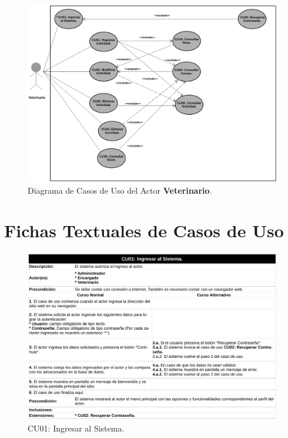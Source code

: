 \documentclass[11pt,oneside]{book}
\begin{document}
\begin{figure}[tbhp]
\centerline{\includegraphics[scale=0.5]{figs/capitulo_2_disenio/Diagrama_CU_Veterinario.pdf}}
\caption{Diagrama de Casos de Uso del Actor \textbf{Veterinario}.}
\label{Ap104}
\end{figure}

\newpage
\clearpage
\section{Fichas Textuales de Casos de Uso}\label{ApFCU}

\begin{figure}[tbhp]
\centerline{\includegraphics[scale=0.6]{figs/capitulo_2_disenio/fichas_cu/pg_0001.pdf}}
\caption{CU01: Ingresar al Sistema.}
\label{Ap201}
\end{figure}
\end{document}
